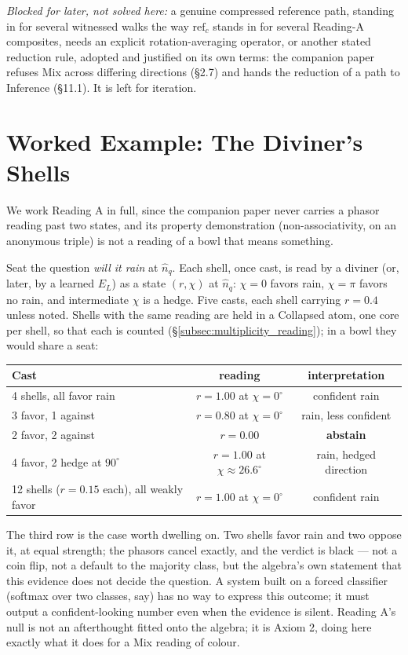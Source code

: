 \documentclass[12pt, a4paper]{article}
\begin{document}
\emph{Blocked for later, not solved here:} a genuine compressed
reference path, standing in for several witnessed walks the way
$\mathrm{ref}_c$ stands in for several Reading-A composites, needs
an explicit rotation-averaging operator, or another stated reduction
rule, adopted and justified on its own terms: the companion paper
refuses Mix across differing directions (\S2.7) and hands the reduction
of a path to Inference (\S11.1). It is left for iteration.

\section{Worked Example: The Diviner's Shells}
\label{sec:worked_example}

We work Reading A in full, since the companion paper never carries a
phasor reading past two states, and its property demonstration
(non-associativity, on an anonymous triple) is not a reading of a
bowl that means something.

Seat the question \emph{will it rain} at $\hat n_q$. Each shell, once
cast, is read by a diviner (or, later, by a learned $E_L$) as a state
$(r,\chi)$ at $\hat n_q$: $\chi=0$ favors rain, $\chi=\pi$ favors no
rain, and intermediate $\chi$ is a hedge. Five casts, each shell carrying $r=0.4$ unless noted. Shells with the same reading are held in a
Collapsed atom, one core per shell, so that each is counted (\S\ref{subsec:multiplicity_reading}); in a
bowl they would share a seat:

\begin{center}
\begin{tabular}{lcc}
\hline
Cast & reading & interpretation \\
\hline
4 shells, all favor rain      & $r=1.00$ at $\chi=0^\circ$   & confident rain \\
3 favor, 1 against            & $r=0.80$ at $\chi=0^\circ$   & rain, less confident \\
2 favor, 2 against            & $r=0.00$                     & \textbf{abstain} \\
4 favor, 2 hedge at $90^\circ$ & $r=1.00$ at $\chi\approx 26.6^\circ$ & rain, hedged direction \\
12 shells ($r=0.15$ each), all weakly favor    & $r=1.00$ at $\chi=0^\circ$   & confident rain \\
\hline
\end{tabular}
\end{center}

The third row is the case worth dwelling on. Two shells favor rain and
two oppose it, at equal strength; the phasors cancel exactly, and the
verdict is black --- not a coin flip, not a default to the majority
class, but the algebra's own statement that this evidence does not
decide the question. A system built on a forced classifier (softmax
over two classes, say) has no way to express this outcome; it must
output a confident-looking number even when the evidence is silent.
Reading A's null is not an afterthought fitted onto the algebra; it is
Axiom 2, doing here exactly what it does for a Mix reading of colour.
\end{document}
